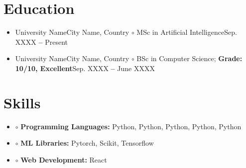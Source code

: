 \documentclass[a4paper,10pt]{article}
\begin{document}
\section*{Education}
\MyHorizontalRule %
  \vspace{-10pt}
  \begin{itemize}[leftmargin=0.15in, label={}, itemsep=-8pt]
    \item \resumeSubheading
      {University Name}{City Name, Country}
      {\hspace{10pt}\textcolor{ColorOne}{$\circ$}\hspace{3pt} MSc in Artificial Intelligence}{Sep. XXXX \textbf{--} Present}
      
    \item \vspace{20pt} \resumeSubheading
      {University Name}{City Name, Country}
      {\hspace{10pt}\textcolor{ColorOne}{$\circ$}\hspace{3pt} BSc in Computer Science; \textbf{Grade: 10/10, Excellent}}{Sep. XXXX \textbf{--} June XXXX}
    
  \end{itemize}



\vspace{3pt}
\section*{Skills}
\MyHorizontalRule %
  \begin{itemize}[leftmargin=0.15in, label={}, itemsep=-8pt]
        
    \item 
        \hspace{10pt}\textcolor{ColorOne}{$\circ$}\hspace{3pt} \textbf{Programming Languages:} Python, Python, Python, Python, Python

    \item \hspace{10pt}\textcolor{ColorOne}{$\circ$}\hspace{3pt} \textbf{ML Libraries:} Pytorch, Scikit, Tensorflow

    \item \hspace{10pt}\textcolor{ColorOne}{$\circ$}\hspace{3pt} \textbf{Web Development:} React
        
        
    
  \end{itemize}
  \vspace{-12pt}
\end{document}

